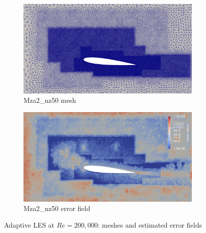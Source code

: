 \begin{figure}[H]
	
	\begin{subfigure}[b]{0.475\textwidth}
		\centering
		\includegraphics[width=1\textwidth]{figures/zonal_adapt_results/Mesh_and_error_plots_Re200k/Mza2_inplane.png}
		\caption{Mza2\_nz50 mesh}
		\label{fig:zonal_Mza2_mesh_Re200k}
	\end{subfigure}
	\begin{subfigure}[b]{0.475\textwidth}
		\centering
		\includegraphics[width=1\textwidth]{figures/zonal_adapt_results/Mesh_and_error_plots_Re200k/Mza2_error.png}
		\caption{Mza2\_nz50 error field}
		\label{fig:zonal_Mza2_error_Re200k}
	\end{subfigure}
	
	\caption{Adaptive LES at $Re = 200,000$: meshes and estimated error fields}
    \label{fig:adapted_meshes_200k}
\end{figure}